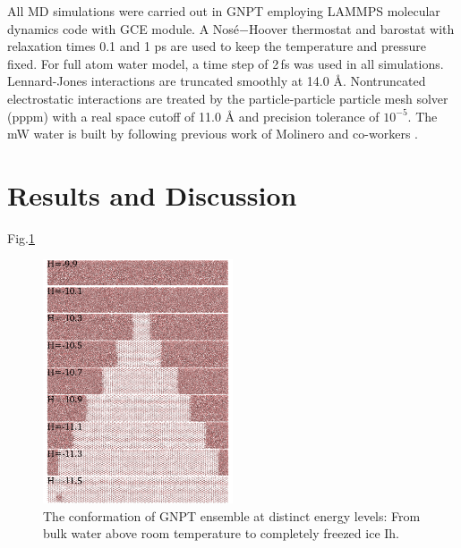 \documentclass[aps,prl,twocolumn,superscriptaddress]{revtex4-1}
\begin{document}
All MD simulations were carried out in GNPT employing LAMMPS molecular dynamics code with GCE module\cite{Xu2012}. A Nosé−Hoover thermostat and barostat\cite{Nose1984,Hoover1985} with  relaxation times 0.1 and 1 ps are used to keep the temperature and pressure fixed. For full atom water model, a time step of 2\,fs  was used in all simulations. Lennard-Jones interactions are truncated smoothly at 14.0 Å. Nontruncated electrostatic interactions are treated by the particle-particle particle mesh solver (pppm) with a real space cutoff of 11.0 Å and precision tolerance of $10^{-5}$.  The mW water is built by following previous work of Molinero and co-workers\cite{Molinero2009} .
\section{Results and Discussion} 

Fig.\ref{fig:conformation}
\begin{figure}[ht]
\centering{}\includegraphics[width=0.5\textwidth]{conf.png} 
\caption{The conformation of GNPT ensemble at distinct energy levels: From bulk water above room temperature to completely freezed ice Ih.
\label{fig:conformation} }
\end{figure}
\end{document}
